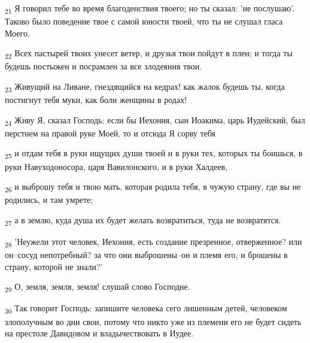 \begin{tcolorbox}
\textsubscript{21} Я говорил тебе во время благоденствия твоего; но ты сказал: 'не послушаю'. Таково было поведение твое с самой юности твоей, что ты не слушал гласа Моего.
\end{tcolorbox}
\begin{tcolorbox}
\textsubscript{22} Всех пастырей твоих унесет ветер, и друзья твои пойдут в плен; и тогда ты будешь постыжен и посрамлен за все злодеяния твои.
\end{tcolorbox}
\begin{tcolorbox}
\textsubscript{23} Живущий на Ливане, гнездящийся на кедрах! как жалок будешь ты, когда постигнут тебя муки, как боли женщины в родах!
\end{tcolorbox}
\begin{tcolorbox}
\textsubscript{24} Живу Я, сказал Господь: если бы Иехония, сын Иоакима, царь Иудейский, был перстнем на правой руке Моей, то и отсюда Я сорву тебя
\end{tcolorbox}
\begin{tcolorbox}
\textsubscript{25} и отдам тебя в руки ищущих души твоей и в руки тех, которых ты боишься, в руки Навуходоносора, царя Вавилонского, и в руки Халдеев,
\end{tcolorbox}
\begin{tcolorbox}
\textsubscript{26} и выброшу тебя и твою мать, которая родила тебя, в чужую страну, где вы не родились, и там умрете;
\end{tcolorbox}
\begin{tcolorbox}
\textsubscript{27} а в землю, куда душа их будет желать возвратиться, туда не возвратятся.
\end{tcolorbox}
\begin{tcolorbox}
\textsubscript{28} 'Неужели этот человек, Иехония, есть создание презренное, отверженное? или он--сосуд непотребный? за что они выброшены--он и племя его, и брошены в страну, которой не знали?'
\end{tcolorbox}
\begin{tcolorbox}
\textsubscript{29} О, земля, земля, земля! слушай слово Господне.
\end{tcolorbox}
\begin{tcolorbox}
\textsubscript{30} Так говорит Господь: запишите человека сего лишенным детей, человеком злополучным во дни свои, потому что никто уже из племени его не будет сидеть на престоле Давидовом и владычествовать в Иудее.
\end{tcolorbox}
